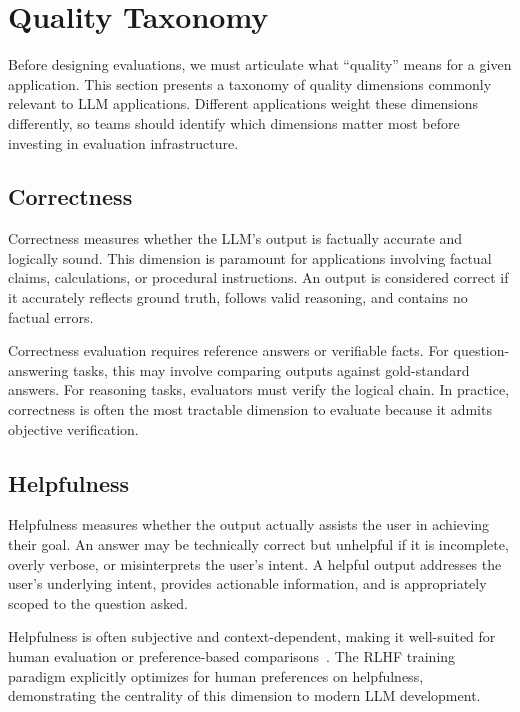 
\section{Quality Taxonomy}
\label{sec:quality-taxonomy}

Before designing evaluations, we must articulate what ``quality'' means for a given application. This section presents a taxonomy of quality dimensions commonly relevant to LLM applications. Different applications weight these dimensions differently, so teams should identify which dimensions matter most before investing in evaluation infrastructure.

\subsection{Correctness}

Correctness measures whether the LLM's output is factually accurate and logically sound. This dimension is paramount for applications involving factual claims, calculations, or procedural instructions. An output is considered correct if it accurately reflects ground truth, follows valid reasoning, and contains no factual errors.

Correctness evaluation requires reference answers or verifiable facts. For question-answering tasks, this may involve comparing outputs against gold-standard answers. For reasoning tasks, evaluators must verify the logical chain. In practice, correctness is often the most tractable dimension to evaluate because it admits objective verification.

\subsection{Helpfulness}

Helpfulness measures whether the output actually assists the user in achieving their goal. An answer may be technically correct but unhelpful if it is incomplete, overly verbose, or misinterprets the user's intent. A helpful output addresses the user's underlying intent, provides actionable information, and is appropriately scoped to the question asked.

Helpfulness is often subjective and context-dependent, making it well-suited for human evaluation or preference-based comparisons~\citep{ouyang2022training}. The RLHF training paradigm explicitly optimizes for human preferences on helpfulness, demonstrating the centrality of this dimension to modern LLM development.


